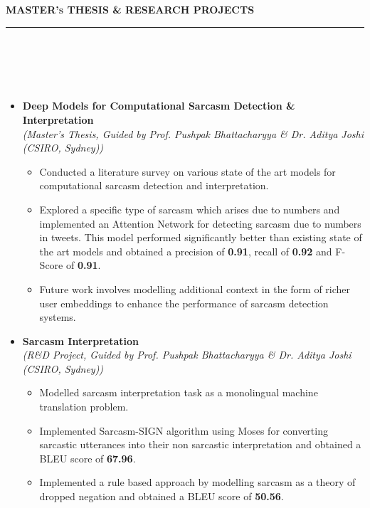 \documentclass[a4paper,10pt]{article}
\newcommand{\isep}{-2 pt}
\newcommand{\lsep}{-0.5cm}
\newcommand{\resheading}[1]{{\small
        {
            \begin{minipage}
                {0.975\textwidth}\textbf{{\textsc{#1 \vphantom{p\^{E}} }}}
                \\[-0.3cm]
                \hrule
            \end{minipage}
            \\[-0.5cm]
        }
 }}
\begin{document}

\resheading{\textbf{\large MASTER's THESIS \& RESEARCH PROJECTS}}\\[\lsep]
\\[-0.4cm]
\begin{itemize}

\item \textbf{ Deep Models for Computational Sarcasm Detection \& Interpretation} \\ \emph{(Master's Thesis, Guided by Prof. Pushpak Bhattacharyya \& Dr. Aditya Joshi (CSIRO, Sydney))}
    \\ [-0.6cm]
    \begin{itemize}\itemsep \isep
    \item Conducted a literature survey on various state of the art models for computational sarcasm detection and interpretation.
    \item Explored a specific type of sarcasm which arises due to numbers and implemented an Attention Network for detecting sarcasm due to numbers in tweets. This model performed significantly better than existing state of the art models and obtained a precision of \textbf{0.91}, recall of \textbf{0.92} and F-Score of \textbf{0.91}.
    \item Future work involves modelling additional context in the form of richer user embeddings to enhance the performance of sarcasm detection systems.
    \end{itemize}

\item \textbf{Sarcasm Interpretation}
\\ {\emph{(R\&D Project, Guided by Prof. Pushpak Bhattacharyya \& Dr. Aditya Joshi (CSIRO, Sydney))}}
    \\ [-0.6cm]
    \begin{itemize}\itemsep \isep
    \item Modelled sarcasm interpretation task as a monolingual machine translation problem.
    \item Implemented Sarcasm-SIGN algorithm using Moses for converting sarcastic utterances into their non sarcastic interpretation and obtained a BLEU score of \textbf{67.96}.
    \item Implemented a rule based approach by modelling sarcasm as a theory of dropped negation and obtained a BLEU score of \textbf{50.56}.

    \end{itemize}

\end{itemize}
\end{document}
